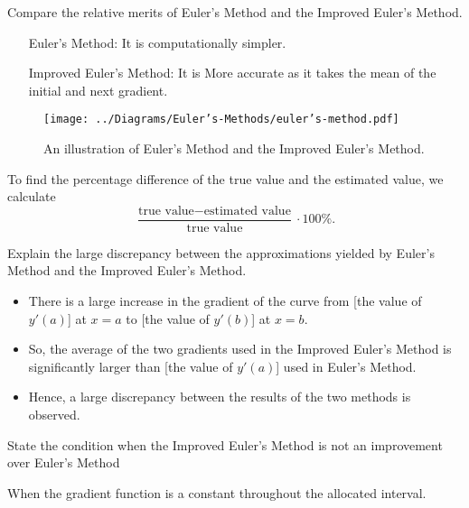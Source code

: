 \documentclass[oneside]{book}
\begin{document}
\begin{note}{}{}
  Compare the relative merits of Euler's Method and the Improved Euler's Method.
  \begin{enumerate}[wide=0pt, leftmargin=*]
    \item[Euler's Method:] It is computationally simpler.
    \item[Improved Euler's Method:] It is More accurate as it takes the mean of the initial and next gradient. 
  \end{enumerate}
\end{note}
\begin{figure}[H]
  \centering
  \texttt{[image: ../Diagrams/Euler's-Methods/euler's-method.pdf]}
  \caption{An illustration of \textcolor{green!50!blue}{Euler's Method} and the \textcolor{green!85!black}{Improved Euler's Method}.}
  \label{fig:euler's-methods}
\end{figure}
\begin{note}
  To find the percentage difference of the true value and the estimated value, we calculate
  \[\frac{\text{true value}-\text{estimated value}}{\text{true value}}\cdot 100\%.\]
\end{note}
\begin{note}
  Explain the large discrepancy between the approximations yielded by Euler's Method and the Improved Euler's Method.
  \begin{itemize}
    \item There is a large increase in the gradient of the curve from [the value of \(y'(a)\)] at \(x=a\) to [the value of \(y'(b)\)] at \(x=b\). 
    \item So, the average of the two gradients used in the Improved Euler's Method is significantly larger than [the value of \(y'(a)\)] used in Euler's Method.
    \item Hence, a large discrepancy between the results of the two methods is observed.
  \end{itemize}
\end{note}
\begin{note}
  State the condition when the Improved Euler's Method is not an improvement over Euler's Method
  \begin{center}
    When the gradient function is a constant throughout the allocated interval.
  \end{center} 
\end{note}
\end{document}
